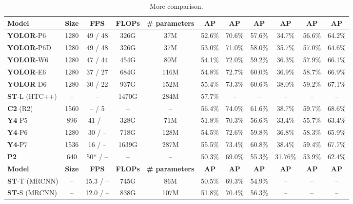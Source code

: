 \documentclass[10pt,twocolumn,letterpaper]{article}
\begin{document}
\begin{table*}[t]
\centering
\begin{threeparttable}[t]
	\footnotesize
	\caption{More comparison.}
	\label{table:more}
	\setlength\tabcolsep{5.8pt}
	\begin{tabular}{lcccccccccc}
		\toprule
		\textbf{Model} & \textbf{Size} & \textbf{FPS} & \textbf{FLOPs} & \textbf{\# parameters} & \textbf{AP} & \textbf{AP} & \textbf{AP} & \textbf{AP} & \textbf{AP} & \textbf{AP} \\				
		\midrule
		\textbf{YOLOR}-P6 & 1280 & 49 / 48  & 326G & 37M & 52.6\% & 70.6\% & 57.6\% & 34.7\% & 56.6\% & 64.2\% \\
		\textbf{YOLOR}-P6D & 1280 & 49 / 48  & 326G & 37M & 53.0\% & 71.0\% & 58.0\% & 35.7\% & 57.0\% & 64.6\% \\
		\textbf{YOLOR}-W6 & 1280 & 47 / 44 & 454G & 80M & 54.1\% & 72.0\% & 59.2\% & 36.3\% & 57.9\% & 66.1\% \\
		\textbf{YOLOR}-E6 & 1280 & 37 / 27 & 684G & 116M & 54.8\% & 72.7\% & 60.0\% & 36.9\% & 58.7\% & 66.9\% \\		
		\textbf{YOLOR}-D6 & 1280 & 30 / 22 & 937G & 152M & 55.4\% & 73.3\% & 60.6\% & 38.0\% & 59.2\% & 67.1\% \\		
		\midrule
		\textbf{ST}-L (HTC++) & -- & -- & 1470G & 284M & 57.7\% & -- & -- & -- & -- & -- \\
		\midrule
		\textbf{C2} (R2) & 1560 & -- / 5 & -- & -- & 56.4\% & 74.0\% & 61.6\% & 38.7\% & 59.7\% & 68.6\% \\
		\midrule
		\textbf{Y4}-P5 & 896 & 41 / -- & 328G & 71M & 51.8\% & 70.3\% & 56.6\% & 33.4\% & 55.7\% & 63.4\% \\
		\textbf{Y4}-P6 & 1280 & 30 / -- & 718G & 128M & 54.5\% & 72.6\% & 59.8\% & 36.8\% & 58.3\% & 65.9\% \\
		\textbf{Y4}-P7 & 1536 & 16 / -- & 1639G & 287M & 55.5\% & 73.4\% & 60.8\% & 38.4\% & 59.4\% & 67.7\% \\
		\midrule
		\textbf{P2} & 640 & 50* / -- & -- & -- & 50.3\% & 69.0\% & 55.3\% & 31.76\% & 53.9\% & 62.4\% \\
		\midrule
		\midrule
		\textbf{Model} & \textbf{Size} & \textbf{FPS} & \textbf{FLOPs} & \textbf{\# parameters} & \textbf{AP} & \textbf{AP} & \textbf{AP} & \textbf{AP} & \textbf{AP} & \textbf{AP} \\		
		\midrule
		\textbf{ST}-T (MRCNN) & -- & 15.3 / -- & 745G & 86M & 50.5\% & 69.3\% & 54.9\% & -- & -- & -- \\
		\textbf{ST}-S (MRCNN) & -- & 12.0 / -- & 838G & 107M & 51.8\% & 70.4\% & 56.3\% & -- & -- & -- \\

\end{tabular}
\end{threeparttable}
\end{table*}
\end{document}
